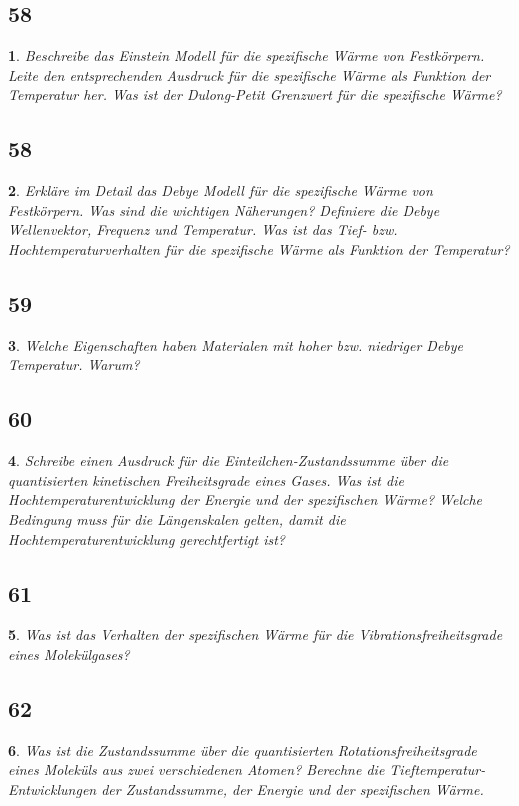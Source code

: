 \documentclass[12pt,a4paper]{report}
\newtheorem{myfrag}{}%
\begin{document}
\subsection{58}
\begin{myfrag}
Beschreibe das Einstein Modell für die spezifische Wärme von Festkörpern.
Leite den entsprechenden Ausdruck für die spezifische Wärme als Funktion
der Temperatur her. Was ist der Dulong-Petit Grenzwert für die spezifische
Wärme?
\end{myfrag}
\subsection{58}
\begin{myfrag}
Erkläre im Detail das Debye Modell für die spezifische Wärme von
Festkörpern. Was sind die wichtigen Näherungen? Definiere die Debye
Wellenvektor, Frequenz und Temperatur. Was ist das Tief- bzw.
Hochtemperaturverhalten für die spezifische Wärme als Funktion der
Temperatur?
\end{myfrag}
\subsection{59}
\begin{myfrag}
Welche Eigenschaften haben Materialen mit hoher bzw. niedriger Debye
Temperatur. Warum?
\end{myfrag}
\subsection{60}
\begin{myfrag}
Schreibe einen Ausdruck für die Einteilchen-Zustandssumme über die
quantisierten kinetischen Freiheitsgrade eines Gases. Was ist die
Hochtemperaturentwicklung der Energie und der spezifischen Wärme?
Welche Bedingung muss für die Längenskalen gelten, damit die
Hochtemperaturentwicklung gerechtfertigt ist?
\end{myfrag}
\subsection{61}
\begin{myfrag}
Was ist das Verhalten der spezifischen Wärme für die Vibrationsfreiheitsgrade
eines Molekülgases?
\end{myfrag}
\subsection{62}
\begin{myfrag}
Was ist die Zustandssumme über die quantisierten Rotationsfreiheitsgrade
eines Moleküls aus zwei verschiedenen Atomen? Berechne die
Tieftemperatur-Entwicklungen der Zustandssumme, der Energie und der
spezifischen Wärme.
\end{myfrag}
\end{document}
